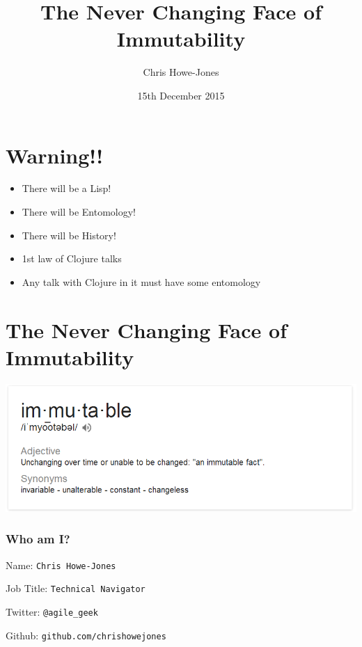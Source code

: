 \documentclass[11pt]{article}
\author{Chris Howe-Jones}
\date{15th December 2015}
\title{The Never Changing Face of Immutability}
\begin{document}
\maketitle


\section*{Warning!!}
\label{sec:orgheadline1}

\begin{itemize}
\item There will be a Lisp!
\item There will be Entomology!
\item There will be History!
\end{itemize}
\begin{NOTES}
\begin{itemize}
\item 1st law of Clojure talks
\item Any talk with Clojure in it must have some entomology
\end{itemize}
\end{NOTES}


\section*{The Never Changing Face of Immutability}
\label{sec:orgheadline29}

\includegraphics[width=.9\linewidth]{./immutable-defined.png}

\subsubsection*{Who am I?}
\label{sec:orgheadline2}

Name:      \texttt{Chris Howe-Jones}

Job Title: \texttt{Technical Navigator}

Twitter:   \texttt{@agile\_geek}

Github:    \texttt{github.com/chrishowejones}
\end{document}
